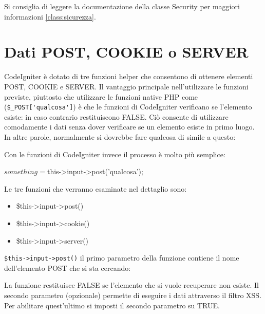 
Si consiglia di leggere la documentazione della classe Security per maggiori informazioni \vref{class:sicurezza}.

\section*{Dati POST, COOKIE o SERVER}
CodeIgniter è dotato di tre funzioni helper che consentono di ottenere elementi POST, COOKIE e SERVER. Il vantaggio principale nell'utilizzare le funzioni previste, piuttosto che utilizzare le funzioni native \ac{PHP} come (\verb|$_POST['qualcosa']|) è che le funzioni di CodeIgniter verificano se l'elemento esiste: in caso contrario restituiscono FALSE. Ciò consente di utilizzare comodamente i dati senza dover verificare se un elemento esiste in primo luogo. In altre parole, normalmente si dovrebbe fare qualcosa di simile a questo:


Con le funzioni di CodeIgniter invece il processo è molto più semplice:

\begin{code}
$something = $this->input->post('qualcosa');
\end{code}

Le tre funzioni che verranno esaminate nel dettaglio sono:

\begin{itemize}
\item \$this->input->post()
\item \$this->input->cookie()
\item \$this->input->server()
\end{itemize}

\verb|$this->input->post()| il primo parametro della funzione contiene il nome dell'elemento POST che si sta cercando:


La funzione restituisce FALSE se l'elemento che si vuole recuperare non esiste. Il secondo parametro (opzionale) permette di eseguire i dati attraverso il filtro \ac{XSS}. Per abilitare quest'ultimo si imposti il secondo parametro su TRUE.

